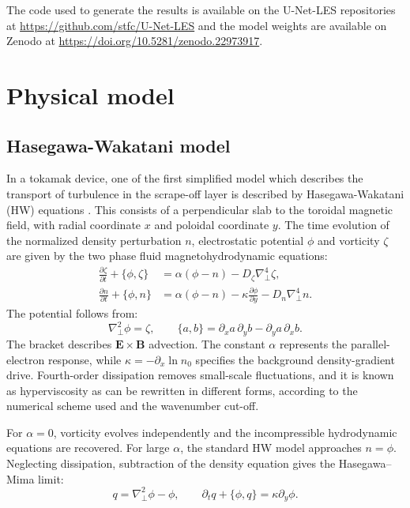 \documentclass[authoryear,preprint,review,12pt]{elsarticle}
\begin{document}
The code used to generate the results is available on the U-Net-LES repositories at \url{https://github.com/stfc/U-Net-LES} and the model weights are available on Zenodo at \url{https://doi.org/10.5281/zenodo.22973917}.
%
%
%
%
%
%
%
\section{Physical model}\label{sec:PhysicalModel}

\subsection{Hasegawa-Wakatani model}
In a tokamak device, one of the first simplified model which describes the transport of turbulence in the scrape-off layer is described by Hasegawa-Wakatani (HW) equations \citep{hasegawa_self-organization_1987}. This consists of a perpendicular slab to the toroidal magnetic field, with radial coordinate $x$ and poloidal coordinate $y$. The time evolution of the normalized density perturbation $n$, electrostatic potential $\phi$ and vorticity $\zeta$ are given by the two phase fluid magnetohydrodynamic equations:
\begin{align}
    \frac{\partial\zeta}{\partial t}+\{\phi,\zeta\}
    &=\alpha(\phi-n)-D_\zeta\nabla_\perp^4\zeta,
    \label{eq:hw_vorticity}\\
    \frac{\partial n}{\partial t}+\{\phi,n\}
    &=\alpha(\phi-n)-\kappa\frac{\partial\phi}{\partial y}
      -D_n\nabla_\perp^4 n.
    \label{eq:hw_density}
\end{align}
The potential follows from:
\begin{equation}
    \nabla_\perp^2\phi=\zeta,
    \qquad
    \{a,b\}=\partial_xa\,\partial_yb-\partial_ya\,\partial_xb.
    \label{eq:hw_poisson}
\end{equation}
The bracket describes $\mathbf{E}\times\mathbf{B}$ advection. The constant $\alpha$ represents the parallel-electron response, while $\kappa=-\partial_x\ln n_0$ specifies the background density-gradient drive. Fourth-order dissipation removes small-scale fluctuations, and it is known as hyperviscosity as can be rewritten in different forms, according to the numerical scheme used and the wavenumber cut-off.

For $\alpha=0$, vorticity evolves independently and the incompressible hydrodynamic equations are recovered. For large $\alpha$, the standard HW model approaches $n=\phi$. Neglecting dissipation, subtraction of the density equation gives the Hasegawa--Mima limit:
\begin{equation}
    q=\nabla_\perp^2\phi-\phi,
    \qquad
    \partial_tq+\{\phi,q\}=\kappa\partial_y\phi.
    \label{eq:hm_limit}
\end{equation}
\end{document}
